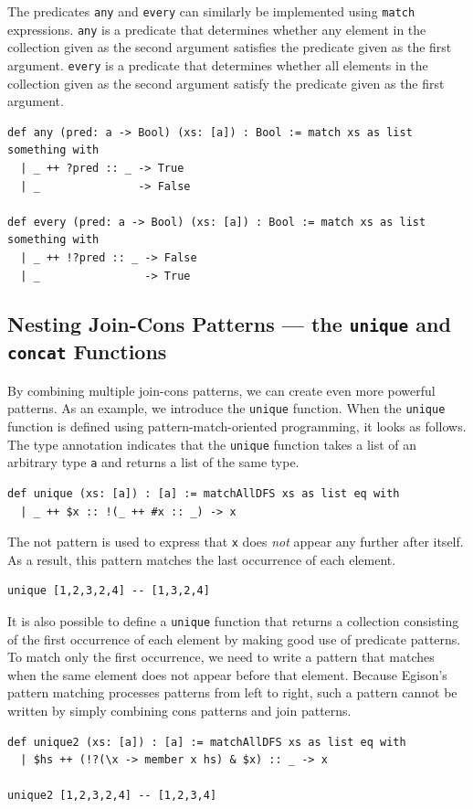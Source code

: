 The predicates \lstinline{any} and \lstinline{every} can similarly be implemented using \lstinline{match} expressions.
\lstinline{any} is a predicate that determines whether any element in the collection given as the second argument satisfies the predicate given as the first argument.
\lstinline{every} is a predicate that determines whether all elements in the collection given as the second argument satisfy the predicate given as the first argument.

\begin{lstlisting}[language=egison,numbers=none]
def any (pred: a -> Bool) (xs: [a]) : Bool := match xs as list something with
  | _ ++ ?pred :: _ -> True
  | _               -> False

def every (pred: a -> Bool) (xs: [a]) : Bool := match xs as list something with
  | _ ++ !?pred :: _ -> False
  | _                -> True
\end{lstlisting}

\subsection{Nesting Join-Cons Patterns --- the \texttt{unique} and \texttt{concat} Functions}\label{pmo-nested-join-cons}

By combining multiple join-cons patterns, we can create even more powerful patterns.
As an example, we introduce the \lstinline{unique} function.
When the \lstinline{unique} function is defined using pattern-match-oriented programming, it looks as follows.
The type annotation indicates that the \lstinline{unique} function takes a list of an arbitrary type \lstinline{a} and returns a list of the same type.
\begin{lstlisting}[language=egison,numbers=none]
def unique (xs: [a]) : [a] := matchAllDFS xs as list eq with
  | _ ++ $x :: !(_ ++ #x :: _) -> x
\end{lstlisting}
The not pattern is used to express that \lstinline{x} does \emph{not} appear any further after itself.
As a result, this pattern matches the last occurrence of each element.
\begin{lstlisting}[language=egison,numbers=none]
unique [1,2,3,2,4] -- [1,3,2,4]
\end{lstlisting}

It is also possible to define a \lstinline{unique} function that returns a collection consisting of the first occurrence of each element by making good use of predicate patterns.
To match only the first occurrence, we need to write a pattern that matches when the same element does not appear before that element.
Because Egison's pattern matching processes patterns from left to right, such a pattern cannot be written by simply combining cons patterns and join patterns.
\begin{lstlisting}[language=egison,numbers=none]
def unique2 (xs: [a]) : [a] := matchAllDFS xs as list eq with
  | $hs ++ (!?(\x -> member x hs) & $x) :: _ -> x

unique2 [1,2,3,2,4] -- [1,2,3,4]
\end{lstlisting}

